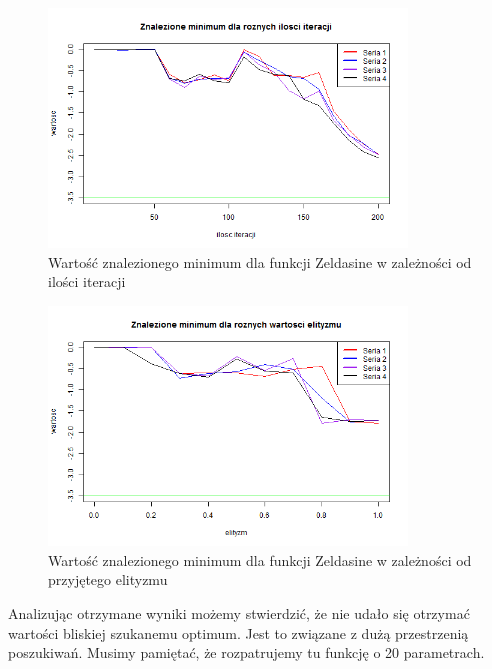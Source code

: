\documentclass[11pt, a4paper]{article}
\newcommand{\fbi}{\leavevmode{\parindent=1em\indent}}
\begin{document}
\begin{figure}[H]
	\begin{center}
		\includegraphics[width=0.85\textwidth]{./assets/Zeldasine205.png}
		\caption{Wartość znalezionego minimum dla funkcji Zeldasine w zależności od ilości iteracji}
		\label{fig:zeldasine5}
	\end{center}
\end{figure}


\begin{figure}[H]
	\begin{center}
		\includegraphics[width=0.85\textwidth]{./assets/Zeldasine206.png}
		\caption{Wartość znalezionego minimum dla funkcji Zeldasine w zależności od przyjętego elityzmu}
		\label{fig:zeldasine6}
	\end{center}
\end{figure}

\fbi
Analizując otrzymane wyniki możemy stwierdzić, że nie udało się otrzymać wartości bliskiej szukanemu optimum. Jest to związane z dużą przestrzenią poszukiwań. Musimy pamiętać, że rozpatrujemy tu funkcję o 20 parametrach.
\end{document}
